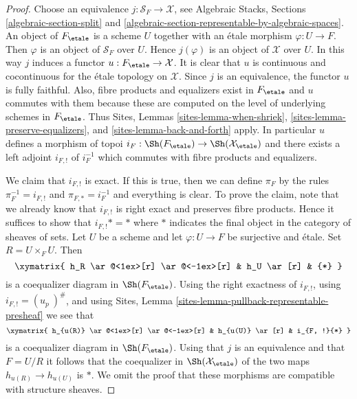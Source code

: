 \begin{proof}
Choose an equivalence $j : \mathcal{S}_F \to \mathcal{X}$, see
Algebraic Stacks, Sections \ref{algebraic-section-split} and
\ref{algebraic-section-representable-by-algebraic-spaces}.
An object of $F_\etale$ is a scheme $U$ together with an
\'etale morphism $\varphi : U \to F$. Then $\varphi$ is an object
of $\mathcal{S}_F$ over $U$. Hence $j(\varphi)$ is an object of
$\mathcal{X}$ over $U$. In this way $j$ induces a functor
$u : F_\etale \to \mathcal{X}$. It is clear that
$u$ is continuous and cocontinuous for the \'etale topology on
$\mathcal{X}$. Since $j$ is an equivalence, the functor $u$ is fully
faithful. Also, fibre products and equalizers exist in $F_\etale$
and $u$ commutes with them because these are computed on the level
of underlying schemes in $F_\etale$. Thus
Sites, Lemmas \ref{sites-lemma-when-shriek},
\ref{sites-lemma-preserve-equalizers}, and
\ref{sites-lemma-back-and-forth}
apply. In particular $u$ defines a morphism of topoi
$i_F : \Sh(F_\etale) \to \Sh(\mathcal{X}_\etale)$
and there exists a left adjoint $i_{F, !}$ of $i_F^{-1}$ which commutes
with fibre products and equalizers.

\medskip\noindent
We claim that $i_{F, !}$ is exact. If this is true, then we can define
$\pi_F$ by the rules $\pi_F^{-1} = i_{F, !}$ and $\pi_{F, *} = i_F^{-1}$
and everything is clear. To prove the claim, note that we already know
that $i_{F, !}$
is right exact and preserves fibre products. Hence it suffices to show
that $i_{F, !}* = *$ where $*$ indicates the final object in the category
of sheaves of sets. Let $U$ be a scheme and let
$\varphi : U \to F$ be surjective and \'etale. Set $R = U \times_F U$.
Then
$$
\xymatrix{
h_R \ar@<1ex>[r] \ar@<-1ex>[r] & h_U \ar[r] & {*}
}
$$
is a coequalizer diagram in $\Sh(F_\etale)$. Using the
right exactness of $i_{F, !}$, using $i_{F, !} = (u_p\ )^\#$, and using
Sites, Lemma \ref{sites-lemma-pullback-representable-presheaf}
we see that
$$
\xymatrix{
h_{u(R)} \ar@<1ex>[r] \ar@<-1ex>[r] & h_{u(U)} \ar[r] & i_{F, !}{*}
}
$$
is a coequalizer diagram in $\Sh(F_\etale)$. Using that
$j$ is an equivalence and that $F = U/R$ it follows that
the coequalizer in $\Sh(\mathcal{X}_\etale)$ of the
two maps $h_{u(R)} \to h_{u(U)}$ is $*$. We omit the proof that
these morphisms are compatible with structure sheaves.
\end{proof}

